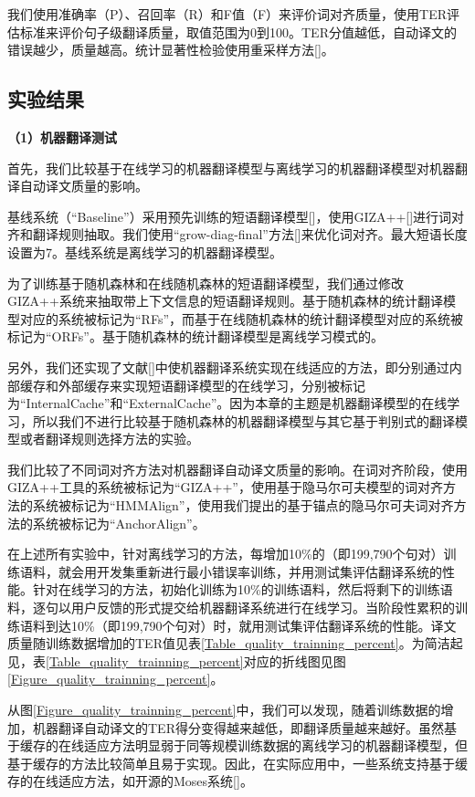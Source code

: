 我们使用准确率（P）、召回率（R）和F值（F）来评价词对齐质量，使用TER评估标准来评价句子级翻译质量，取值范围为0到100。TER分值越低，自动译文的错误越少，质量越高。统计显著性检验使用重采样方法[\cite{Koehn:2004b}]。

\subsection{实验结果}

\textbf{（1）机器翻译测试}

首先，我们比较基于在线学习的机器翻译模型与离线学习的机器翻译模型对机器翻译自动译文质量的影响。

基线系统（“Baseline”）采用预先训练的短语翻译模型[\cite{Koehn:2003}]，使用GIZA++[\cite{Och:2000}]进行词对齐和翻译规则抽取。我们使用“grow-diag-final”方法[\cite{Koehn:2003}]来优化词对齐。最大短语长度设置为7。基线系统是离线学习的机器翻译模型。

为了训练基于随机森林和在线随机森林的短语翻译模型，我们通过修改GIZA++系统来抽取带上下文信息的短语翻译规则。基于随机森林的统计翻译模型对应的系统被标记为“RFs”，而基于在线随机森林的统计翻译模型对应的系统被标记为“ORFs”。基于随机森林的统计翻译模型是离线学习模式的。

另外，我们还实现了文献[\cite{Bertoldi:2014}]中使机器翻译系统实现在线适应的方法，即分别通过内部缓存和外部缓存来实现短语翻译模型的在线学习，分别被标记为“InternalCache”和“ExternalCache”。因为本章的主题是机器翻译模型的在线学习，所以我们不进行比较基于随机森林的机器翻译模型与其它基于判别式的翻译模型或者翻译规则选择方法的实验。

我们比较了不同词对齐方法对机器翻译自动译文质量的影响。在词对齐阶段，使用GIZA++工具的系统被标记为“GIZA++”，使用基于隐马尔可夫模型的词对齐方法的系统被标记为“HMMAlign”，使用我们提出的基于锚点的隐马尔可夫词对齐方法的系统被标记为“AnchorAlign”。

在上述所有实验中，针对离线学习的方法，每增加10\%的（即199,790个句对）训练语料，就会用开发集重新进行最小错误率训练，并用测试集评估翻译系统的性能。针对在线学习的方法，初始化训练为10\%的训练语料，然后将剩下的训练语料，逐句以用户反馈的形式提交给机器翻译系统进行在线学习。当阶段性累积的训练语料到达10\%（即199,790个句对）时，就用测试集评估翻译系统的性能。译文质量随训练数据增加的TER值见表\ref{Table_quality_trainning_percent}。为简洁起见，表\ref{Table_quality_trainning_percent}对应的折线图见图\ref{Figure_quality_trainning_percent}。

从图\ref{Figure_quality_trainning_percent}中，我们可以发现，随着训练数据的增加，机器翻译自动译文的TER得分变得越来越低，即翻译质量越来越好。虽然基于缓存的在线适应方法明显弱于同等规模训练数据的离线学习的机器翻译模型，但基于缓存的方法比较简单且易于实现。因此，在实际应用中，一些系统支持基于缓存的在线适应方法，如开源的Moses系统[\cite{Koehn:2007}]。

